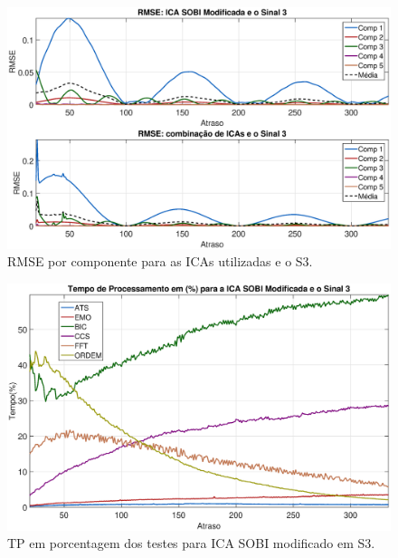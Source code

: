 \documentclass[a4paper,12pt]{monografia}
\theoremstyle{plain}
\theoremstyle{definition}
\theoremstyle{remark}
\begin{document}
\begin{figure}[!htb]
    \begin{center}
    \advance\leftskip -1.5cm
    \includegraphics[scale=0.45]{imagens/ImagensParaOAnexo/RMSEcompATodasICAsSinal3.eps}
    \caption{RMSE por componente para as ICAs utilizadas e o S3.}
    \label{fig:RMSEAS3}    
    \end{center}
\end{figure}

\begin{figure}[!htb]
    \begin{center}
    \advance\leftskip -1.5cm
    \includegraphics[scale=0.45]{imagens/ImagensParaOAnexo/TPPAICASOBImodSinal3.eps}
    \caption{TP em porcentagem dos testes para ICA SOBI modificado em S3.}
    \label{fig:TPSMAS3}    
    \end{center}
\end{figure}
\end{document}

